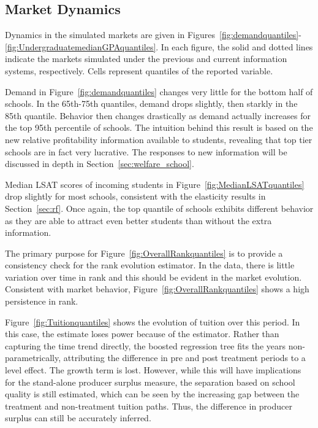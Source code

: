 \documentclass[12pt]{article}
\theoremstyle{definition}
\begin{document}

\subsection{Market Dynamics}
\label{sec:market_dynamics}
Dynamics in the simulated markets are given in Figures~\ref{fig:demandquantiles}-\ref{fig:UndergraduatemedianGPAquantiles}. In each figure, the solid and dotted lines indicate the markets simulated under the previous and current information systems, respectively. Cells represent quantiles of the reported variable.

Demand in Figure~\ref{fig:demandquantiles} changes very little for the bottom half of schools. In the 65th-75th quantiles, demand drops slightly, then starkly in the 85th quantile. Behavior then changes drastically as demand actually increases for the top 95th percentile of schools. The intuition behind this result is based on the new relative profitability information available to students, revealing that top tier schools are in fact very lucrative. The responses to new information will be discussed in depth in Section~\ref{sec:welfare_school}.

Median LSAT scores of incoming students in Figure~\ref{fig:MedianLSATquantiles} drop slightly for most schools, consistent with the elasticity results in Section~\ref{sec:rf}. Once again, the top quantile of schools exhibits different behavior as they are able to attract even better students than without the extra information.

The primary purpose for Figure~\ref{fig:OverallRankquantiles} is to provide a consistency check for the rank evolution estimator. In the data, there is little variation over time in rank and this should be evident in the market evolution. Consistent with market behavior, Figure~\ref{fig:OverallRankquantiles} shows a high persistence in rank.

Figure~\ref{fig:Tuitionquantiles} shows the evolution of tuition over this period. In this case, the estimate loses power because of the estimator. Rather than capturing the time trend directly, the boosted regression tree fits the years non-parametrically, attributing the difference in pre and post treatment periods to a level effect. The growth term is lost. However, while this will have implications for the stand-alone producer surplus measure, the separation based on school quality is still estimated, which can be seen by the increasing gap between the treatment and non-treatment tuition paths. Thus, the difference in producer surplus can still be accurately inferred.
\end{document}
